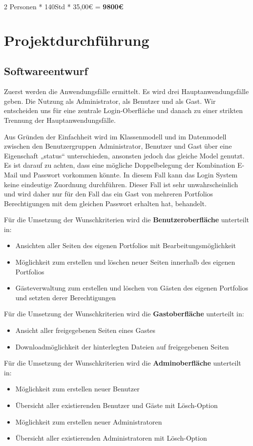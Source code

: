 \documentclass[10pt]{scrarticle}
\begin{document}
2 Personen * 140Std * 35,00\euro{} 				= \textbf{9800\euro{}}

\section{Projektdurchführung}
\subsection{Softwareentwurf}

Zuerst werden die Anwendungsfälle ermittelt. Es wird drei Hauptanwendungsfälle geben. Die Nutzung als Administrator, als Benutzer und als Gast. Wir entscheiden uns für eine zentrale Login-Oberfläche und danach zu einer strikten Trennung der Hauptanwendungsfälle.

Aus Gründen der Einfachheit wird im Klassenmodell und im Datenmodell zwischen den Benutzergruppen Administrator, Benutzer und Gast über eine Eigenschaft „status“ unterschieden, ansonsten jedoch das gleiche Model genutzt. 
Es ist darauf zu achten, dass eine mögliche Doppelbelegung der Kombination E-Mail und Passwort vorkommen könnte. In diesem Fall kann das Login System keine eindeutige Zuordnung durchführen. 
Dieser Fall ist sehr unwahrscheinlich und wird daher nur für den Fall das ein Gast von mehreren Portfolios Berechtigungen mit dem gleichen Passwort erhalten hat, behandelt.

Für die Umsetzung der Wunschkriterien wird die \textbf{Benutzeroberfläche} unterteilt in:
\begin{itemize}
	\item Ansichten aller Seiten des eigenen Portfolios mit Bearbeitungsmöglichkeit
	\item  Möglichkeit zum erstellen und löschen neuer Seiten innerhalb des eigenen Portfolios
	\item  Gästeverwaltung zum erstellen und löschen von Gästen des eigenen Portfolios und setzten derer Berechtigungen    \end{itemize}
	
Für die Umsetzung der Wunschkriterien wird die \textbf{Gastoberfläche} unterteilt in:
\begin{itemize}
	\item Ansicht aller freigegebenen Seiten eines Gastes
	\item Downloadmöglichkeit der hinterlegten Dateien auf freigegebenen Seiten
\end{itemize}

Für die Umsetzung der Wunschkriterien wird die \textbf{Adminoberfläche} unterteilt in:
\begin{itemize}
	\item Möglichkeit zum erstellen neuer Benutzer
	\item Übersicht aller existierenden Benutzer und Gäste mit Lösch-Option
	\item Möglichkeit zum erstellen neuer Administratoren
	\item Übersicht aller existierenden Administratoren mit Lösch-Option
\end{itemize}
\end{document}
